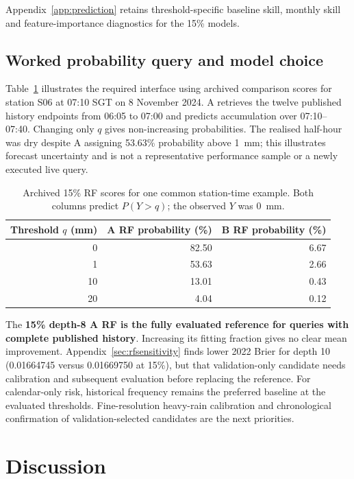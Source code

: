\documentclass[11pt,a4paper]{article}
\begin{document}
Appendix~\ref{app:prediction} retains threshold-specific baseline skill, monthly skill and feature-importance diagnostics for the 15\% models.

\FloatBarrier
\subsection{Worked probability query and model choice}
Table~\ref{tab:workedquery} illustrates the required interface using archived comparison scores for station S06 at 07:10 SGT on 8 November 2024. A retrieves the twelve published history endpoints from 06:05 to 07:00 and predicts accumulation over 07:10--07:40. Changing only $q$ gives non-increasing probabilities. The realised half-hour was dry despite A assigning 53.63\% probability above 1~mm; this illustrates forecast uncertainty and is not a representative performance sample or a newly executed live query.
\begin{table}[htbp]\centering\small
\begin{tabular}{rrr}\toprule
Threshold $q$ (mm) & A RF probability (\%) & B RF probability (\%)\\\midrule
0 & 82.50 & 6.67 \\
1 & 53.63 & 2.66 \\
10 & 13.01 & 0.43 \\
20 & 4.04 & 0.12 \\
\bottomrule\end{tabular}
\caption{Archived 15\% RF scores for one common station-time example. Both columns predict $P(Y>q)$; the observed $Y$ was 0~mm.}\label{tab:workedquery}
\end{table}

The \textbf{15\% depth-8 A RF is the fully evaluated reference for queries with complete published history}. Increasing its fitting fraction gives no clear mean improvement. Appendix~\ref{sec:rfsensitivity} finds lower 2022 Brier for depth 10 (0.01664745 versus 0.01669750 at 15\%), but that validation-only candidate needs calibration and subsequent evaluation before replacing the reference. For calendar-only risk, historical frequency remains the preferred baseline at the evaluated thresholds. Fine-resolution heavy-rain calibration and chronological confirmation of validation-selected candidates are the next priorities.

\FloatBarrier
\section{Discussion}
\end{document}
